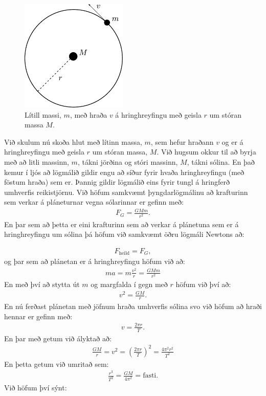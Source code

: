 \ifdefined \wholebook \else\documentclass[oneside]{book}\usepackage{EdlBook}\graphicspath{{figures/}}
\begin{document}
\begin{minipage}{\linewidth}
\begin{figure}
\vspace{-1cm}
\centering
\includegraphics[width=2in]{figures/planets.pdf}
\caption{Lítill massi, $m$, með hraða $v$ á hringhreyfingu með geisla $r$ um stóran massa $M$.}
\label{fig:hringhreyfing}
\end{figure}

Við skulum nú skoða hlut með lítinn massa, $m$, sem hefur hraðann $v$ og er á hringhreyfingu með geisla $r$ um stóran massa, $M$. Við hugsum okkur til að byrja með að litli massinn, $m$, tákni jörðina og stóri massinn, $M$, tákni sólina. En það kemur í ljós að lögmálið gildir engu að síður fyrir hvaða hringhreyfingu (með föstum hraða) sem er. Þannig gildir lögmálið eins fyrir tungl á hringferð umhverfis reikistjörnu. Við höfum samkvæmt þyngdarlögmálinu að krafturinn sem verkar á pláneturnar vegna sólarinnar er gefinn með:
\begin{align*}
    F_G = \frac{GMm}{r^2}.
\end{align*}
En þar sem að þetta er eini krafturinn sem að verkar á plánetuna sem er á hringhreyfingu um sólina þá höfum við samkvæmt öðru lögmáli Newtons að:
\end{minipage}
\begin{align*}
    F_{\text{heild}} = F_G,
\end{align*}
og þar sem að plánetan er á hringhreyfingu höfum við að:
\begin{align*}
    ma = m \frac{v^2}{r} = \frac{GMm}{r^2}
\end{align*}
En með því að stytta út $m$ og margfalda í gegn með $r$ höfum við því að:
\begin{align*}
    v^2 = \frac{GM}{r}.
\end{align*}
En nú ferðast plánetan með jöfnum hraða umhverfis sólina svo við höfum að hraði hennar er gefinn með:
\begin{align*}
    v = \frac{2\pi r}{T}.
\end{align*}
En þar með getum við ályktað að:
\begin{align*}
    \frac{GM}{r} = v^2 =  \left( \frac{2\pi r}{T} \right)^2 = \frac{4\pi^2r^2}{T^2}
\end{align*}
En þetta getum við umritað sem:
\begin{align*}
    \frac{r^3}{T^2} = \frac{GM}{4\pi^2} = \text{fasti}.
\end{align*}
Við höfum því sýnt:
\end{document}
